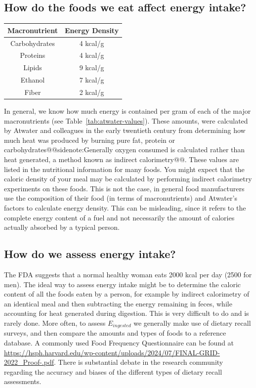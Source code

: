 \documentclass{tufte-handout}
\makeatletter
\def\sidenote#1{@@sidenote:#1@@}
\makeatother
\begin{document}
\subsection{How do the foods we eat affect energy intake?}

\begin{margintable}
\centering
\caption{Caloric density of the three major macronutrients and ethanol.  These values are known as Atwater's factors}\label{tab:atwater-values}
\begin{tabular}{cc}
\hline
\textbf{Macronutrient}       & \textbf{Energy Density}                     \\
\hline
Carbohydrates & 4 kcal/g \\
Proteins & 4 kcal/g \\
Lipids & 9 kcal/g \\
Ethanol & 7 kcal/g \\
Fiber & 2 kcal/g \\

\hline
\end{tabular}
\end{margintable}

In general, we know how much energy is contained per gram of each of the major macronutrients (see Table~\ref{tab:atwater-values}).  These amounts, were calculated by Atwater and colleagues in the early twentieth century from determining how much heat was produced by burning pure fat, protein or carbohydrates\sidenote{Generally oxygen consumed is calculated rather than heat generated, a method known as indirect calorimetry}.  These values are listed in the nutritional information for many foods.  You might expect that the caloric density of your meal may be calculated by performing indirect calorimetry experiments on these foods.  This is not the case, in general food manufacturers use the composition of their food (in terms of macronutrients) and Atwater's factors to calculate energy density.  This can be misleading, since it refers to the complete energy content of a fuel and not necessarily the amount of calories actually absorbed by a typical person.  

\subsection{How do we assess energy intake?}

The FDA suggests that a normal healthy woman eats 2000 kcal per day (2500 for men).  The ideal way to assess energy intake might be to determine the caloric content of all the foods eaten by a person, for example by indirect calorimetry of an identical meal and then subtracting the energy remaining in feces, while accounting for heat generated during digestion.  This is very difficult to do and is rarely done.   More often, to assess $E_{ingested}$ we generally make use of dietary recall surveys, and then compare the amounts and types of foods to a reference database.  A commonly used Food Frequency Questionnaire can be found at \url{https://hsph.harvard.edu/wp-content/uploads/2024/07/FINAL-GRID-2022_Proof-.pdf}.  There is substantial debate in the research community regarding the accuracy and biases of the different types of dietary recall assessments.
\end{document}
